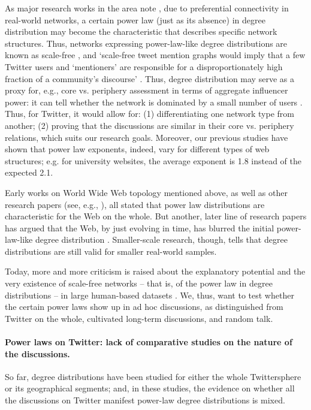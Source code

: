 As major research works in the area note \cite{BarabasiAlbert,BroderKumarMaghoul,HubermanAdamic}, due to preferential connectivity in real-world networks, a certain power law (just as its absence) in degree distribution may become the characteristic that describes specific network structures. Thus, networks expressing power-law-like degree distributions are known as scale-free \cite{AlbertBarabasi,EdigerJiangRiedy}, and ‘scale-free tweet mention graphs would imply that a few Twitter users and ‘mentioners’ are responsible for a disproportionately high fraction of a community’s discourse’ \cite[p.~587]{EdigerJiangRiedy}. Thus, degree distribution may serve as a proxy for, e.g., core vs. periphery assessment in terms of aggregate influencer power: it can tell whether the network is dominated by a small number of users \cite{YeWu}. Thus, for Twitter, it would allow for: (1) differentiating one network type from another; (2) proving that the discussions are similar in their core vs. periphery relations, which suits our research goals. Moreover, our previous studies \cite{BlekanovSergeevMaksimov2017} have shown that power law exponents, indeed, vary for different types of web structures; e.g. for university websites, the average exponent is 1.8 instead of the expected 2.1.

Early works on World Wide Web topology mentioned above, as well as other research papers (see, e.g., \cite{FaloustosFaloustosFaloustos}), all stated that power law distributions are characteristic for the Web on the whole. But another, later line of research papers has argued that the Web, by just evolving in time, has blurred the initial power-law-like degree distribution \cite{ChenChangGovindan,MeuselVignaLehmberg}. Smaller-scale research, though, tells that degree distributions are still valid for smaller real-world samples.

Today, more and more criticism is raised about the explanatory potential and the very existence of scale-free networks -- that is, of the power law in degree distributions -- in large human-based datasets \cite{BroidoClauset}. We, thus, want to test whether the certain power laws show up in ad hoc discussions, as distinguished from Twitter on the whole, cultivated long-term discussions, and random talk.

\paragraph{Power laws on Twitter: lack of comparative studies on the nature of the discussions.} So far, degree distributions have been studied for either the whole Twittersphere or its geographical segments; and, in these studies, the evidence on whether all the discussions on Twitter manifest power-law degree distributions is mixed.

